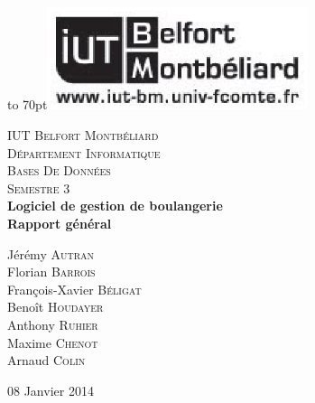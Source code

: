 \documentclass[12pt]{report}
\begin{document}
{
\begin{titlepage}

\vbox to 70pt{\hfill\includegraphics[height=3cm]{images/logo-iut.eps}}\
\begin{center}

\textsc{\LARGE IUT Belfort Montbéliard}\\[0.7cm]
\textsc{\LARGE Département Informatique}\\[1.0cm]
\textsc{\Large Bases De Données}\\[0.5cm]
\textsc{\Large Semestre 3}\\[5cm]


{ \huge \bfseries Logiciel de gestion de boulangerie}\\[0.5cm]
{ \huge \bfseries Rapport général}\\[5cm]

\begin{large}
Jérémy \textsc{Autran}\\[0.3em]
Florian \textsc{Barrois}\\[0.3em]
François-Xavier \textsc{Béligat}\\[0.3em]
Benoît \textsc{Houdayer}\\[0.3em]
Anthony \textsc{Ruhier}\\[0.3em]
Maxime \textsc{Chenot}\\[0.3em]
Arnaud \textsc{Colin}\\[0.3em]

\end{large}

\vfill

{\large 08 Janvier 2014}

\end{center}
\end{titlepage}
}

{\clearpage\mbox{}\thispagestyle{empty}\clearpage}
\setcounter{page}{1}
%
{\large{}}












\tableofcontents
{}

%
%
\end{document}

